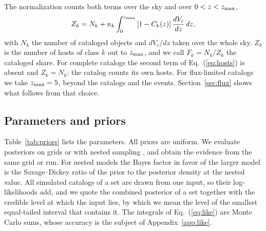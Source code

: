 \documentclass[aps,prd,reprint,twocolumn,superscriptaddress,nofootinbib,floatfix]{revtex4-2}
\newcommand{\req}[1]{#1}
\providecommand{\NormZmax}{\req{5}}
\begin{document}
The normalization counts both terms over the sky and over $0<z<z_{\rm max}$,
\begin{equation}
Z_k=N_k+n_k\int_0^{z_{\rm max}}\left[1-C_k(z)\right]\frac{dV_c}{dz}\,dz ,
\label{eq:norm}
\end{equation}
with $N_k$ the number of cataloged objects and $dV_c/dz$ taken over the whole
sky. $Z_k$ is the number of hosts of class $k$ out to $z_{\rm max}$, and we
call $F_k=N_k/Z_k$ the cataloged share. For complete catalogs the second term
of Eq.~(\ref{eq:hosts}) is absent and $Z_k=N_k$: the catalog counts its own
hosts. For flux-limited catalogs we take $z_{\rm max}=\NormZmax$, beyond the
catalogs and the events. Section~\ref{sec:flux} shows what follows from that
choice.

\subsection{Parameters and priors}
\label{sec:priors}

Table~\ref{tab:priors} lists the parameters. All priors are uniform. We
evaluate posteriors on grids or with nested sampling
\cite{Speagle:2019ivv}, and obtain the evidence from the same grid or run.
For nested models the Bayes factor in favor of the larger model is the
Savage--Dickey ratio of the prior to the posterior density at the nested
value. All simulated catalogs of a set are drawn from one input, so their
log-likelihoods add, and we quote the combined posterior of a set together
with the credible level at which the input lies, by which we mean the level
of the smallest equal-tailed interval that contains it. The integrals of
Eq.~(\ref{eq:like}) are Monte Carlo sums, whose accuracy is the subject of
Appendix~\ref{app:like}.
\end{document}
